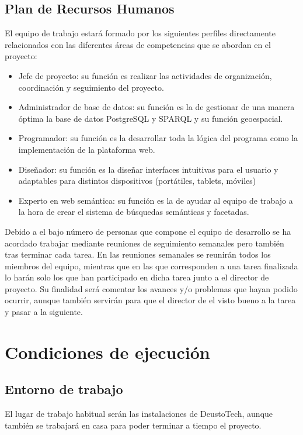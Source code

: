\section{Plan de Recursos Humanos}

El equipo de trabajo estará formado por los siguientes perfiles directamente relacionados con las diferentes áreas de competencias que se abordan en el proyecto: 

\begin{itemize}
	\item Jefe de proyecto: su función es realizar las actividades de organización, coordinación y seguimiento del proyecto.
	\item Administrador de base de datos: su función es la de gestionar de una manera óptima la base de datos PostgreSQL y SPARQL y su función geoespacial. 
	\item Programador: su función es la desarrollar toda la lógica del programa como la implementación de la plataforma web. 
	\item Diseñador: su función es la diseñar interfaces intuitivas para el usuario y adaptables para distintos dispositivos (portátiles, tablets, móviles) 
	\item Experto en web semántica: su función es la de ayudar al equipo de trabajo a la hora de crear el sistema de búsquedas semánticas y facetadas. 
\end{itemize}

Debido a el bajo número de personas que compone el equipo de desarrollo se ha acordado trabajar mediante reuniones de seguimiento semanales pero también tras terminar cada tarea. En las reuniones semanales se reunirán todos los miembros del equipo, mientras que en las que corresponden a una tarea finalizada lo harán solo los que han participado en dicha tarea junto a el director de proyecto. Su finalidad será comentar los avances y/o problemas que hayan podido ocurrir, aunque también servirán para que el director de el visto bueno a la tarea y pasar a la siguiente. 

\chapter{Condiciones de ejecución}

\section{Entorno de trabajo}

El lugar de trabajo habitual serán las instalaciones de DeustoTech, aunque también se trabajará en casa para poder terminar a tiempo el proyecto.

